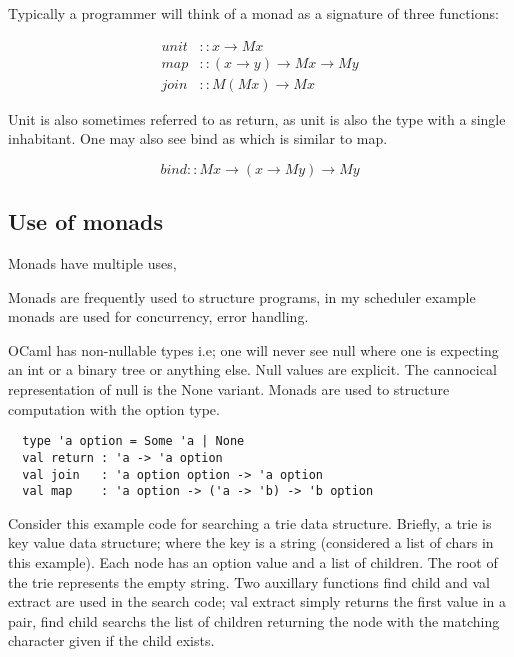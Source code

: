 \documentclass[a4paper,10pt]{article}
\begin{document}
Typically a programmer will think of a monad as a signature of three
functions:

\begin{equation}
  \begin{split}
    unit &:: x \rightarrow M x                                 \\
    map  &:: (x \rightarrow y) \rightarrow M x \rightarrow M y \\
    join &:: M (M x) \rightarrow M x
  \end{split}
\end{equation}

Unit is also sometimes referred to as return, as unit is also the type with a single inhabitant.
One may also see bind as which is similar to map.

\begin{equation}
  bind :: M x \rightarrow (x \rightarrow M y) \rightarrow M y
\end{equation}

\subsection{Use of monads}
Monads have multiple uses, 

Monads are frequently used to structure programs, in my scheduler example monads are
used for concurrency, error handling.

OCaml has non-nullable types i.e; one will never see null where one is expecting an
int or a binary tree or anything else.
Null values are explicit. The cannocical representation of null is the None variant.
Monads are used to structure computation with the option type.

\begin{verbatim}
  type 'a option = Some 'a | None
  val return : 'a -> 'a option
  val join   : 'a option option -> 'a option
  val map    : 'a option -> ('a -> 'b) -> 'b option
\end{verbatim}

Consider this example code for searching a trie data structure. Briefly,
a trie is key value data structure; where the key is a string (considered a
list of chars in this example). Each node has an option value and a list of
children. The root of the trie represents the empty string. Two auxillary
functions find child and val extract are used in the search code;
val extract simply returns the first value in a pair, find child searchs
the list of children returning the node with the matching character given
if the child exists.
\end{document}
